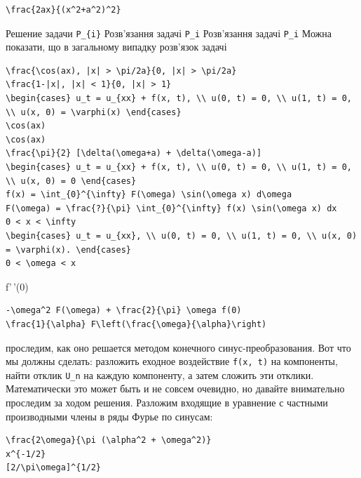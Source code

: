 \documentclass[
  ukrainian,
]{article}
\begin{document}
\begin{verbatim}
\frac{2ax}{(x^2+a^2)^2}
\end{verbatim}

Решение задачи \texttt{P\_\{i\}} Розв'язання задачі \texttt{P\_i}
Розв'язання задачі \texttt{P\_i} Можна показати, що в загальному випадку
розв'язок задачі

\begin{verbatim}
\frac{\cos(ax), |x| > \pi/2a}{0, |x| > \pi/2a}
\frac{1-|x|, |x| < 1}{0, |x| > 1}
\begin{cases} u_t = u_{xx} + f(x, t), \\ u(0, t) = 0, \\ u(1, t) = 0, \\ u(x, 0) = \varphi(x) \end{cases}
\cos(ax)
\cos(ax)
\frac{\pi}{2} [\delta(\omega+a) + \delta(\omega-a)]
\begin{cases} u_t = u_{xx} + f(x, t), \\ u(0, t) = 0, \\ u(1, t) = 0, \\ u(x, 0) = 0 \end{cases}
f(x) = \int_{0}^{\infty} F(\omega) \sin(\omega x) d\omega
F(\omega) = \frac{?}{\pi} \int_{0}^{\infty} f(x) \sin(\omega x) dx
0 < x < \infty
\begin{cases} u_t = u_{xx}, \\ u(0, t) = 0, \\ u(1, t) = 0, \\ u(x, 0) = \varphi(x). \end{cases}
0 < \omega < x
\end{verbatim}

f'\,'(0)

\begin{verbatim}
-\omega^2 F(\omega) + \frac{2}{\pi} \omega f(0)
\frac{1}{\alpha} F\left(\frac{\omega}{\alpha}\right)
\end{verbatim}

проследим, как оно решается методом конечного синус-преобразования. Вот
что мы должны сделать: разложить еходное воздействие \texttt{f(x,\ t)}
на компоненты, найти отклик \texttt{U\_n} на каждую компоненту, а затем
сложить эти отклики. Математически это может быть и не совсем очевидно,
но давайте внимательно проследим за ходом решения. Разложим входящие в
уравнение с частными производными члены в ряды Фурье по синусам:

\begin{verbatim}
\frac{2\omega}{\pi (\alpha^2 + \omega^2)}
x^{-1/2}
[2/\pi\omega]^{1/2}
\end{verbatim}
\end{document}
